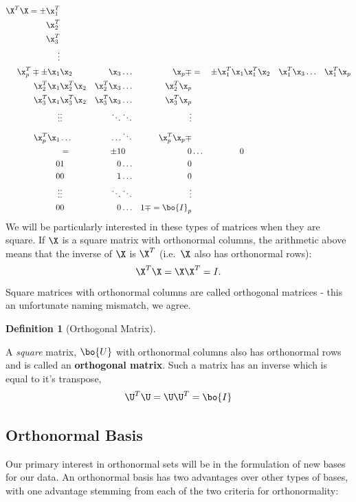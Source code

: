 \documentclass[
]{article}
\theoremstyle{definition}
\newtheorem{definition}{Definition}[section]
\theoremstyle{definition}
\theoremstyle{definition}
\theoremstyle{definition}
\theoremstyle{remark}
\begin{document}
\begin{eqnarray*}
\X^T\X = \pm \x_1^T \\ \x_2^T \\ \x_3^T \\ \vdots \\ \x_p^T  \mp 
\pm \x_1&\x_2&\x_3&\dots&\x_p  \mp 
&=& \pm \x_1^T\x_1 & \x_1^T\x_2 & \x_1^T\x_3 & \dots & \x_1^T\x_p \\
\x_2^T\x_1 & \x_2^T\x_2 & \x_2^T\x_3 & \dots & \x_2^T\x_p \\
\x_3^T\x_1 & \x_3^T\x_2 & \x_3^T\x_3 &\dots & \x_3^T\x_p \\
\vdots & \vdots & \ddots & \ddots & \vdots \\
\x_p^T\x_1 & \dots & \dots & \ddots & \x_p^T\x_p \mp \\
&=&  \pm 1 & 0 & 0 & \dots & 0\\
            0 & 1 & 0 & \dots & 0 \\
             0 & 0 & 1 & \dots & 0 \\
             \vdots & \vdots & \ddots & \ddots & \vdots \\
            0 & 0 & 0 & \dots & 1 \mp 
= \bo{I}_p 
\end{eqnarray*}
We will be particularly interested in these types of matrices when they are square. If \(\X\) is a square matrix with orthonormal columns, the arithmetic above means that the inverse of \(\X\) is \(\X^T\) (i.e.~\(\X\) also has orthonormal rows):
\[\X^T\X=\X\X^T = I.\]
Square matrices with orthonormal columns are called orthogonal matrices - this an unfortunate naming mismatch, we agree.

\begin{definition}[Orthogonal Matrix]
\protect\hypertarget{def:orthmatdef}{}\label{def:orthmatdef}

A \emph{square} matrix, \(\bo{U}\) with orthonormal columns also has orthonormal rows and is called an \textbf{orthogonal matrix}. Such a matrix has an inverse which is equal to it's transpose,
\[\U^T\U=\U\U^T = \bo{I} \]

\end{definition}

\hypertarget{orthonormal-basis}{%
\subsection{Orthonormal Basis}\label{orthonormal-basis}}

Our primary interest in orthonormal sets will be in the formulation of new bases for our data. An orthonormal basis has two advantages over other types of bases, with one advantage stemming from each of the two criteria for orthonormality:
\end{document}
